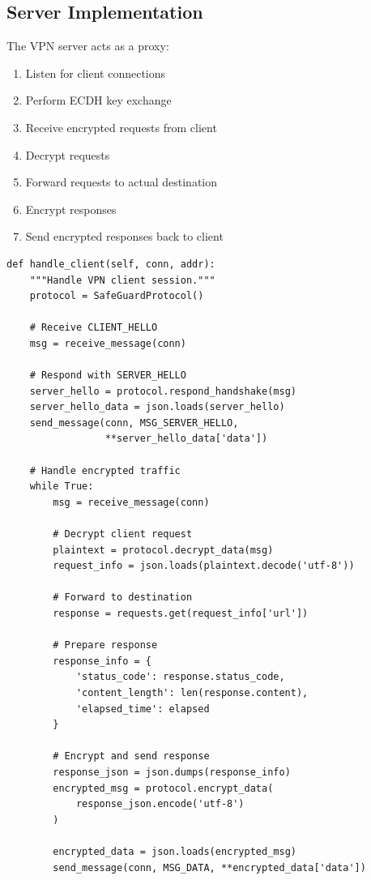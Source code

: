 \documentclass[12pt,a4paper]{article}
\begin{document}
\subsection{Server Implementation}

The VPN server acts as a proxy:

\begin{enumerate}
    \item Listen for client connections
    \item Perform ECDH key exchange
    \item Receive encrypted requests from client
    \item Decrypt requests
    \item Forward requests to actual destination
    \item Encrypt responses
    \item Send encrypted responses back to client
\end{enumerate}

\begin{lstlisting}[style=pythonstyle, caption={Server handling client requests}]
def handle_client(self, conn, addr):
    """Handle VPN client session."""
    protocol = SafeGuardProtocol()
    
    # Receive CLIENT_HELLO
    msg = receive_message(conn)
    
    # Respond with SERVER_HELLO
    server_hello = protocol.respond_handshake(msg)
    server_hello_data = json.loads(server_hello)
    send_message(conn, MSG_SERVER_HELLO, 
                 **server_hello_data['data'])
    
    # Handle encrypted traffic
    while True:
        msg = receive_message(conn)
        
        # Decrypt client request
        plaintext = protocol.decrypt_data(msg)
        request_info = json.loads(plaintext.decode('utf-8'))
        
        # Forward to destination
        response = requests.get(request_info['url'])
        
        # Prepare response
        response_info = {
            'status_code': response.status_code,
            'content_length': len(response.content),
            'elapsed_time': elapsed
        }
        
        # Encrypt and send response
        response_json = json.dumps(response_info)
        encrypted_msg = protocol.encrypt_data(
            response_json.encode('utf-8')
        )
        
        encrypted_data = json.loads(encrypted_msg)
        send_message(conn, MSG_DATA, **encrypted_data['data'])
\end{lstlisting}
\end{document}
